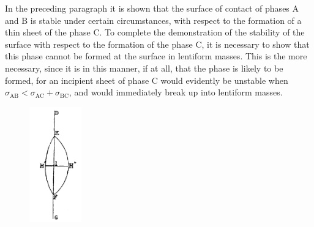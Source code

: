 \documentclass[12pt]{article}
\begin{document}
{In the preceding paragraph it is shown that the surface of contact of phases A and B is stable under certain circumstances, with respect to the formation of a thin sheet of the phase C. To complete the demonstration of the stability of the surface with respect to the formation of the phase C, it is necessary to show that this phase cannot be formed at the surface in lentiform masses. This is the more necessary, since it is in this manner, if at all, that the phase is likely to be formed, for an incipient sheet of phase C would evidently be unstable when $\sigma_{\text{AB}} < \sigma_{\text{AC}} + \sigma_{\text{BC}}$, and would immediately break up into lentiform masses.

\begin{figure} %
    \centering
    \includegraphics[width=0.2\textwidth]{fig_10}
    \caption{ }
    \label{fig_10}
\end{figure}

}
\end{document}
